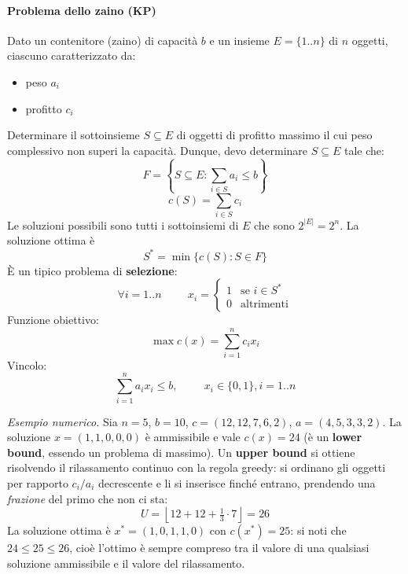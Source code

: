 \documentclass[12pt]{extarticle} %
\begin{document}
\newpage

\paragraph{Problema dello zaino (KP)} Dato un contenitore (zaino) di capacità $b$ e un insieme $E=\{1..n\}$ di $n$ oggetti, ciascuno caratterizzato da:
\begin{itemize}
    \item peso $a_i$
    \item profitto $c_i$
\end{itemize}
Determinare il sottoinsieme $S \subseteq E$ di oggetti di profitto massimo il cui peso complessivo non superi la capacità. Dunque, devo determinare $S\subseteq E$ tale che:
\[
F = \left\{S \subseteq E:\sum_{i\in S} a_i \le b \right\}
\]
\[
c(S) = \sum_{i\in S} c_i
\]
Le soluzioni possibili sono tutti i sottoinsiemi di $E$ che sono $2^{|E|} = 2^n$. La soluzione ottima è
\[
S^* = \min\{c(S):S\in F\}
\]
È un tipico problema di \textbf{selezione}:
\[
\forall i=1..n \hspace{1cm} x_i = \begin{cases}
    1 & \text{se }i\in S^*\\
    0 & \mathrm{altrimenti}
\end{cases}
\]
Funzione obiettivo:
\[
\max c(x) = \sum_{i=1}^n c_ix_i
\]
Vincolo:
\[
\sum_{i=1}^n a_ix_i \le b, \hspace{1cm} x_i\in\{0,1\}, i=1..n
\]

\noindent\textit{Esempio numerico.} Sia $n=5$, $b=10$, $c=(12,12,7,6,2)$, $a=(4,5,3,3,2)$. La soluzione $x=(1,1,0,0,0)$ è ammissibile e vale $c(x)=24$ (è un \textbf{lower bound}, essendo un problema di massimo). Un \textbf{upper bound} si ottiene risolvendo il rilassamento continuo con la regola greedy: si ordinano gli oggetti per rapporto $c_i/a_i$ decrescente e li si inserisce finché entrano, prendendo una \textit{frazione} del primo che non ci sta:
\[
U = \left\lfloor 12 + 12 + \tfrac{1}{3}\cdot 7 \right\rfloor = 26
\]
La soluzione ottima è $x^*=(1,0,1,1,0)$ con $c(x^*)=25$: si noti che $24 \le 25 \le 26$, cioè l'ottimo è sempre compreso tra il valore di una qualsiasi soluzione ammissibile e il valore del rilassamento.
\end{document}
